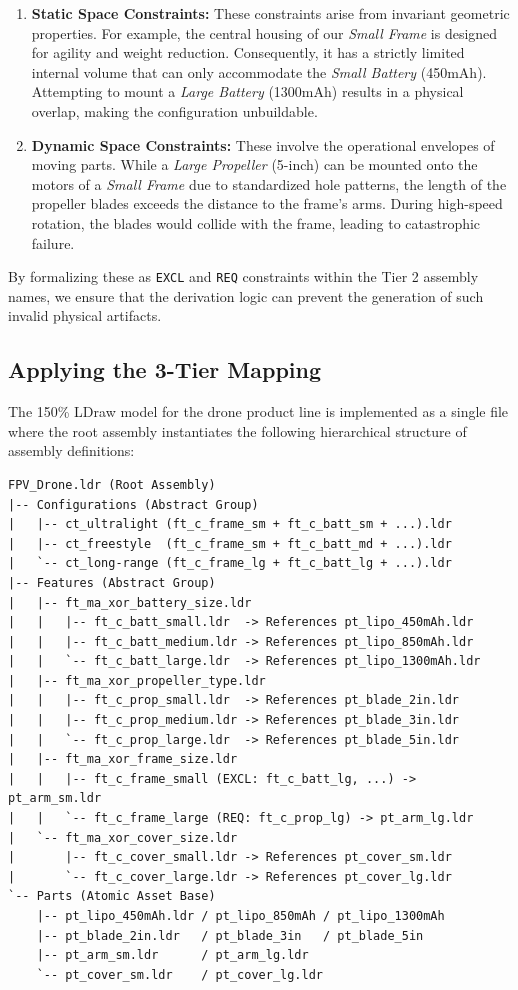 \documentclass[runningheads]{llncs}
\begin{document}
\begin{enumerate}
    \item \textbf{Static Space Constraints:} These constraints arise from invariant geometric properties. For example, the central housing of our \textit{Small Frame} is designed for agility and weight reduction. Consequently, it has a strictly limited internal volume that can only accommodate the \textit{Small Battery} (450mAh). Attempting to mount a \textit{Large Battery} (1300mAh) results in a physical overlap, making the configuration unbuildable.
    \item \textbf{Dynamic Space Constraints:} These involve the operational envelopes of moving parts. While a \textit{Large Propeller} (5-inch) can be mounted onto the motors of a \textit{Small Frame} due to standardized hole patterns, the length of the propeller blades exceeds the distance to the frame's arms. During high-speed rotation, the blades would collide with the frame, leading to catastrophic failure. 
\end{enumerate}

By formalizing these as \texttt{EXCL} and \texttt{REQ} constraints within the Tier 2 assembly names, we ensure that the derivation logic can prevent the generation of such invalid physical artifacts.

\subsection{Applying the 3-Tier Mapping}

The 150\% LDraw model for the drone product line is implemented as a single file where the root assembly instantiates the following hierarchical structure of assembly definitions:

{\footnotesize
\begin{verbatim}
FPV_Drone.ldr (Root Assembly)
|-- Configurations (Abstract Group)
|   |-- ct_ultralight (ft_c_frame_sm + ft_c_batt_sm + ...).ldr
|   |-- ct_freestyle  (ft_c_frame_sm + ft_c_batt_md + ...).ldr
|   `-- ct_long-range (ft_c_frame_lg + ft_c_batt_lg + ...).ldr
|-- Features (Abstract Group)
|   |-- ft_ma_xor_battery_size.ldr
|   |   |-- ft_c_batt_small.ldr  -> References pt_lipo_450mAh.ldr
|   |   |-- ft_c_batt_medium.ldr -> References pt_lipo_850mAh.ldr
|   |   `-- ft_c_batt_large.ldr  -> References pt_lipo_1300mAh.ldr
|   |-- ft_ma_xor_propeller_type.ldr
|   |   |-- ft_c_prop_small.ldr  -> References pt_blade_2in.ldr
|   |   |-- ft_c_prop_medium.ldr -> References pt_blade_3in.ldr
|   |   `-- ft_c_prop_large.ldr  -> References pt_blade_5in.ldr
|   |-- ft_ma_xor_frame_size.ldr
|   |   |-- ft_c_frame_small (EXCL: ft_c_batt_lg, ...) -> pt_arm_sm.ldr
|   |   `-- ft_c_frame_large (REQ: ft_c_prop_lg) -> pt_arm_lg.ldr
|   `-- ft_ma_xor_cover_size.ldr
|       |-- ft_c_cover_small.ldr -> References pt_cover_sm.ldr
|       `-- ft_c_cover_large.ldr -> References pt_cover_lg.ldr
`-- Parts (Atomic Asset Base)
    |-- pt_lipo_450mAh.ldr / pt_lipo_850mAh / pt_lipo_1300mAh
    |-- pt_blade_2in.ldr   / pt_blade_3in   / pt_blade_5in
    |-- pt_arm_sm.ldr      / pt_arm_lg.ldr
    `-- pt_cover_sm.ldr    / pt_cover_lg.ldr
\end{verbatim}
}
\end{document}
